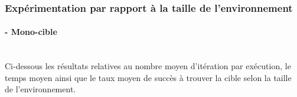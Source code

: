 
\subsubsection{Expérimentation par rapport à la taille de l'environnement}
\paragraph{- Mono-cible}
\textbf{ }\\
Ci-dessous les résultats relatives au nombre moyen d'itération par exécution, le temps moyen ainsi que le taux moyen de succès à trouver la cible selon la taille de l'environnement.

%		


